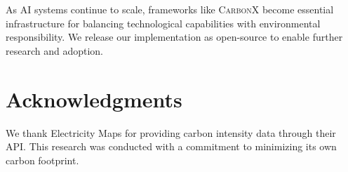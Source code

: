 \documentclass[conference]{IEEEtran}
\newcommand{\carbonx}{\textsc{CarbonX}}
\begin{document}
As AI systems continue to scale, frameworks like \carbonx{} become essential infrastructure for balancing technological capabilities with environmental responsibility. We release our implementation as open-source to enable further research and adoption.

\section*{Acknowledgments}
We thank Electricity Maps for providing carbon intensity data through their API. This research was conducted with a commitment to minimizing its own carbon footprint.


\end{document}
